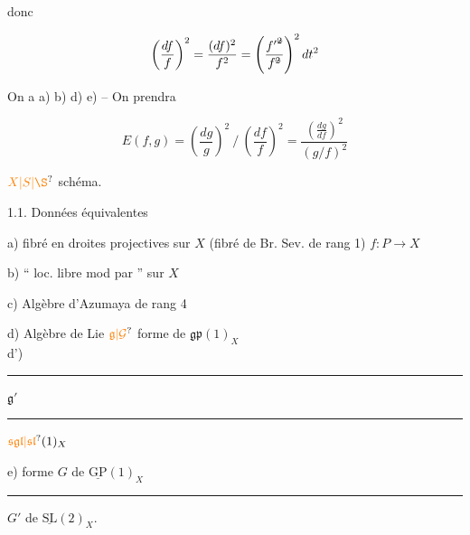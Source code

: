 


donc

\[ \left(\frac{df}{f}\right)^2=\frac{(df)^2}{f^2}=\left(\frac{{f'}^{\deleted{2}}}{f^{\deleted{2}}}\right)^2dt^2 \]

On a a) b)  d) e) -- On prendra

\[ E(f,g)=\left(\frac{dg}{g}\right)^2\mathbin{/}\left(\frac{df}{f}\right)^2=\frac{\left(\frac{dg}{df}\right)^2}{(g/f)^2} \]



$\unsure{X|S|\text{\S}}$ schéma.

1.1. Données équivalentes

a) fibré en droites projectives  sur $X$ (fibré de Br. Sev. de rang 1) $f:P\longrightarrow X$

b) `` loc. libre  mod  par  '' sur $X$

c) Algèbre d'Azumaya  de rang 4


d) Algèbre de Lie $\unsure{\mathfrak g|\mathcal G}$ forme  de $\mathfrak{gp}(1)_X$\\
 d') \rule{2.1cm}{0.3pt} $\mathfrak g'$ \rule{2.1cm}{0.3pt}  $\unsure{\mathfrak{sgl}|\mathfrak{sl}}(1)_X$

e) forme $G$ de $\underline{\mathrm{GP}}(1)_X$\\
   \rule{1.5cm}{0.3pt} $G'$ de $\underline{\mathrm{SL}}(2)_X$.

